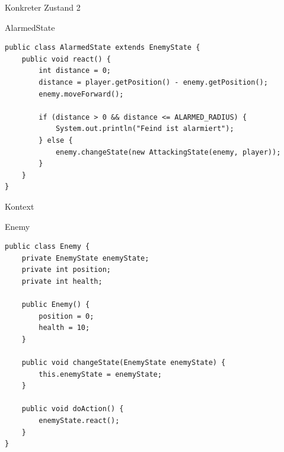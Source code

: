 \begin{frame}[fragile]{Konkreter Zustand 2}
	\begin{exampleblock}{AlarmedState}
 		\begin{lstlisting}
public class AlarmedState extends EnemyState {
	public void react() {
		int distance = 0;
		distance = player.getPosition() - enemy.getPosition();
		enemy.moveForward();
		
		if (distance > 0 && distance <= ALARMED_RADIUS) {
			System.out.println("Feind ist alarmiert");
		} else {
			enemy.changeState(new AttackingState(enemy, player));
		}
	}
} 		    
 		\end{lstlisting}
 	\end{exampleblock}
\end{frame}

\begin{frame}[fragile]{Kontext}
	\begin{exampleblock}{Enemy}
 		\begin{lstlisting}
public class Enemy {
	private EnemyState enemyState;
	private int position;
	private int health;
	
	public Enemy() {
		position = 0;
		health = 10;
	}
	
	public void changeState(EnemyState enemyState) {
		this.enemyState = enemyState;
	}
	
	public void doAction() {
		enemyState.react();
	}
}
 		\end{lstlisting}
 	\end{exampleblock}
\end{frame}

